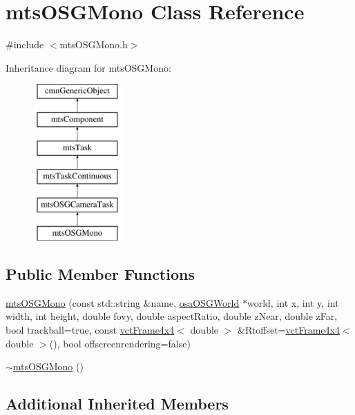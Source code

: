 \hypertarget{classmts_o_s_g_mono}{}\section{mts\+O\+S\+G\+Mono Class Reference}
\label{classmts_o_s_g_mono}


{\ttfamily \#include $<$mts\+O\+S\+G\+Mono.\+h$>$}

Inheritance diagram for mts\+O\+S\+G\+Mono\+:\begin{figure}[H]
\begin{center}
\leavevmode
\includegraphics[height=6.000000cm]{d6/de2/classmts_o_s_g_mono}
\end{center}
\end{figure}
\subsection*{Public Member Functions}
\begin{DoxyCompactItemize}
\item 
\hyperlink{classmts_o_s_g_mono_a45a1c6d8440c6106d7420b04e9a42604}{mts\+O\+S\+G\+Mono} (const std\+::string \&name, \hyperlink{classosa_o_s_g_world}{osa\+O\+S\+G\+World} $\ast$world, int x, int y, int width, int height, double fovy, double aspect\+Ratio, double z\+Near, double z\+Far, bool trackball=true, const \hyperlink{classvct_frame4x4}{vct\+Frame4x4}$<$ double $>$ \&Rtoffset=\hyperlink{classvct_frame4x4}{vct\+Frame4x4}$<$ double $>$(), bool offscreenrendering=false)
\item 
\hyperlink{classmts_o_s_g_mono_a9d0f87dbf36167ea4c258a7e1466202e}{$\sim$mts\+O\+S\+G\+Mono} ()
\end{DoxyCompactItemize}
\subsection*{Additional Inherited Members}



